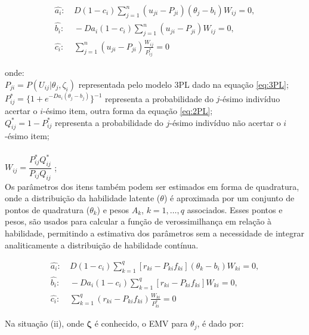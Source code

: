 \[
\begin{aligned}
	\hat{a_i}: & \ D(1 - c_i)\sum_{j=1}^{n}(u_{ji} - P_{ji})(\theta_j - b_i)W_{ij} = 0, \\
	\hat{b_i}: & \ -Da_i(1 - c_i)\sum_{j=1}^{n}(u_{ji} - P_{ji})W_{ij} = 0, \\
	\hat{c_i}: & \ \sum_{j=1}^{n}(u_{ji} - P_{ji})\frac{W_{ij}}{P^*_{ij}} = 0
\end{aligned}
\]

\noindent onde:\\

\noindent $P_{ji} = P(U_{ij}|\theta_j,\zeta_i)$ representada pelo modelo 3PL dado na equação \ref{eq:3PL};\\

\noindent $P^*_{ij} = \{1 + e^{-Da_i(\theta_j - b_j)}\}^{-1} $ representa a probabilidade do $j$-ésimo indivíduo acertar o $i$-ésimo item, outra forma da equação \ref{eq:2PL};\\

\noindent $Q^*_{ij} = 1 - P^*_{ij} $ representa a probabilidade do $j$-ésimo indivíduo não acertar o $i$-ésimo item;\\
\\
\noindent $W_{ij} = \dfrac{P^*_{ij}Q^*_{ij}}{P_{ij}Q_{ij}} $ ;\\

Os parâmetros dos itens também podem ser estimados em forma de quadratura, onde a distribuição da habilidade latente ($\theta$) é aproximada por um conjunto de pontos de quadratura ($\theta_k$)  e pesos $A_k$, $k = 1, \dots, q$ associados. Esses pontos e pesos,  são usados para calcular a função de verossimilhança em relação à habilidade, permitindo a estimativa dos parâmetros sem a necessidade de integrar analiticamente a distribuição de habilidade contínua.

\[
\begin{aligned}
	\hat{a_i}: & \ D(1 - c_i)\sum_{k=1}^{q}[r_{ki} - P_{ki}f_{ki}](\theta_k - b_i)W_{ki} = 0, \\
	\hat{b_i}: & \ -Da_i(1 - c_i)\sum_{k=1}^{q}\left[r_{ki} - P_{ki}f_{ki}\right]W_{ki} = 0, \\
	\hat{c_i}: & \ \sum_{k=1}^{q}(r_{ki} - P_{ki}f_{ki})\frac{W_{ki}}{P^*_{ki}} = 0
\end{aligned}
\]



Na situação (ii), onde $\boldsymbol{\zeta}$ é conhecido, o EMV para $ \theta_j $,  é dado por:\\


